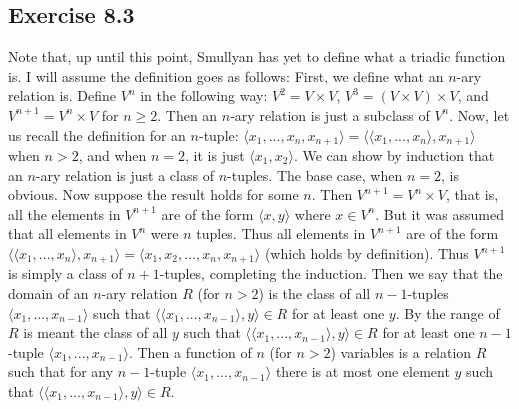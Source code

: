 \documentclass{article}
\theoremstyle{definition}
\begin{document}
\subsection*{Exercise 8.3}
Note that, up until this point, Smullyan has yet to define what a triadic function is. I will assume the definition goes as follows: First, we define what an $n$-ary relation is. 
Define $V^n$ in the following way: $V^2=V\times V$, $V^3=(V\times V)\times V$, and $V^{n+1}=V^n\times V$ for $n\ge 2$. Then an $n$-ary relation is just a subclass of 
$V^n$. Now, let us recall the definition for an $n$-tuple: $\langle x_1,...,x_n,x_{n+1}\rangle =\langle\langle x_1,...,x_n\rangle ,x_{n+1}\rangle $ when $n>2$, and when $n=2$, 
it is just $\langle x_1,x_2\rangle$. We can show by induction that 
an $n$-ary relation is just a class of $n$-tuples. The base case, when $n=2$, is obvious. Now suppose the result holds for some $n$. Then $V^{n+1}=V^n\times V$, that is, all the elements in 
$V^{n+1}$ are of the form $\langle x,y\rangle$ where $x\in V^n$. But it was assumed that all elements in $V^n$ were $n$ tuples. Thus all elements in $V^{n+1}$ are of the form 
$\langle \langle x_1,...,x_n\rangle, x_{n+1}\rangle=\langle x_1,x_2,...,x_n,x_{n+1}\rangle$ (which holds by definition). Thus $V^{n+1}$ is simply a class of $n+1$-tuples, completing the 
induction. Then we say that the 
domain of an $n$-ary relation $R$ (for $n>2$) is the class of all $n-1$-tuples $\langle x_1,...,x_{n-1}\rangle$ such that $\langle\langle x_1,...,x_{n-1}\rangle ,y\rangle\in R$ 
for at least one $y$. By the range of 
$R$ is meant the class of all $y$ such that $\langle\langle x_1,...,x_{n-1}\rangle,y\rangle\in R$ for at least one $n-1$-tuple $\langle x_1,...,x_{n-1}\rangle$. 
Then a function of $n$ (for $n>2$) variables 
is a relation $R$ such that for any $n-1$-tuple $\langle x_1,...,x_{n-1}\rangle$ there is at most one element $y$ such that $\langle\langle x_1,...,x_{n-1}\rangle, y\rangle\in R$.
\end{document}
